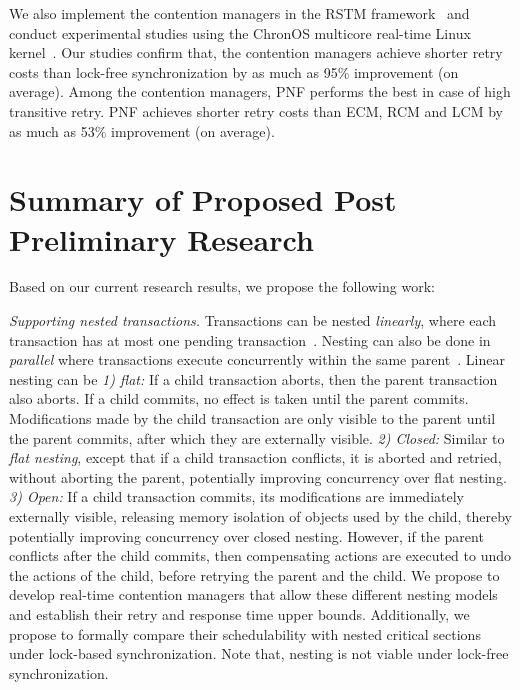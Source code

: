 \documentclass[12pt,english]{report}
\begin{document}
We also implement the contention managers in the RSTM framework~\cite{Shriraman:2007:IHA:1250662.1250676} and conduct experimental studies using the ChronOS multicore real-time Linux kernel~\cite{dellinger2011chronos}. Our studies confirm that, the contention managers achieve shorter retry costs than lock-free synchronization by as much as 95\% improvement (on average). Among the contention managers, PNF performs the best in case of high transitive retry. PNF achieves shorter retry costs than ECM, RCM and LCM by as much as 53\% improvement (on average).

\section{\label{sec:postprelim work}Summary of Proposed Post Preliminary Research}

Based on our current research results, we propose the following work:

\textit{Supporting nested transactions.} Transactions can be nested \textit{linearly}, where each transaction has at most one pending transaction~\cite{Moss2006186}. Nesting can also be done in \textit{parallel} where transactions execute concurrently within the same parent~\cite{volos2009nepaltm}. Linear nesting can be \textit{1) flat:} If a child transaction aborts, then the parent transaction also aborts. If a child commits, no effect is taken until the parent commits. Modifications made by the child transaction are only visible to the parent until the parent commits, after which they are externally visible. 
%
\textit{2) Closed:} Similar to \textit{flat nesting}, except that if a child transaction conflicts, it is aborted and retried, without aborting the parent, potentially improving concurrency over flat nesting. 
%
\textit{3) Open:} If a child transaction commits, its modifications are immediately externally visible, releasing memory isolation  of objects used by the child, thereby potentially improving concurrency over closed nesting. However, if the parent conflicts after the child commits, then compensating actions are executed to undo the actions of the child, before retrying the parent and the child. 
We propose to develop real-time contention managers that allow these different nesting models and establish their retry and response time upper bounds. Additionally, we propose to formally compare their schedulability with nested critical sections under lock-based synchronization. Note that, nesting is not viable under lock-free synchronization. 
\end{document}
